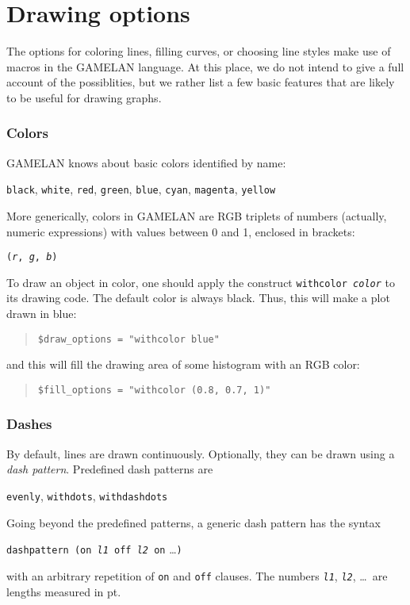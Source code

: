 \documentclass[12pt]{book}
\newcommand{\ttt}[1]{\texttt{#1}}
\begin{document}
\section{Drawing options}

The options for coloring lines, filling curves, or choosing line styles make
use of macros in the GAMELAN language.  At this place, we do not intend to
give a full account of the possiblities, but we rather list a few basic
features that are likely to be useful for drawing graphs.


\subsubsection{Colors}

GAMELAN knows about basic colors identified by name:
\begin{center}
  \ttt{black}, \ttt{white}, \ttt{red}, \ttt{green}, \ttt{blue}, \ttt{cyan},
  \ttt{magenta}, \ttt{yellow}
\end{center}
More generically, colors in GAMELAN are RGB triplets of numbers (actually,
numeric expressions) with values between 0 and 1, enclosed in brackets:
\begin{center}
  \ttt{(\emph{r}, \emph{g}, \emph{b})}
\end{center}

To draw an object in color, one should apply the construct \ttt{withcolor
  \emph{color}} to its drawing code.  The default color is always black.
Thus, this will make a plot drawn in blue:
\begin{quote}
  \begin{footnotesize}
    \ttt{\$draw\_options = "withcolor blue"}
  \end{footnotesize}
\end{quote}
and this will fill the drawing area of some histogram with an RGB color:
\begin{quote}
  \begin{footnotesize}
    \ttt{\$fill\_options = "withcolor (0.8, 0.7, 1)"}
  \end{footnotesize}
\end{quote}


\subsubsection{Dashes}

By default, lines are drawn continuously.  Optionally, they can be drawn using
a \emph{dash pattern}.  Predefined dash patterns are
\begin{center}
  \ttt{evenly}, \ttt{withdots}, \ttt{withdashdots}
\end{center}
Going beyond the predefined patterns, a generic dash pattern has the syntax
\begin{center}
  \ttt{dashpattern (on \emph{l1} off \emph{l2} on} \ldots \ttt{)}
\end{center}
with an arbitrary repetition of \ttt{on} and \ttt{off} clauses.  The numbers
\ttt{\emph{l1}}, \ttt{\emph{l2}}, \ldots\ are lengths measured in pt.
\end{document}
